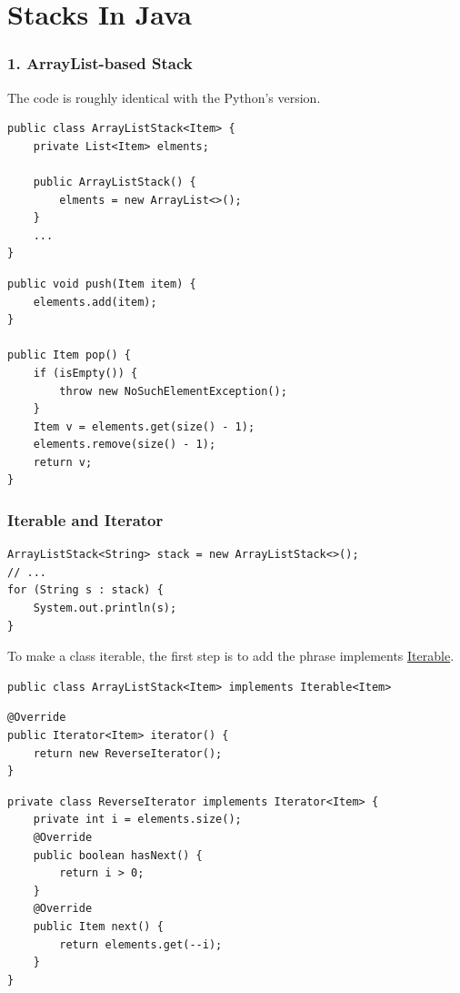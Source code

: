 \documentclass[aspectratio=169, 14pt]{beamer}
\begin{document}
\section{\textcolor{darkmidnightblue}{Stacks In Java}}

\begin{frame}[fragile]
    \frametitle{1. ArrayList-based Stack}
    The code is roughly identical with the Python's version.
    \begin{verbatim}
public class ArrayListStack<Item> {
    private List<Item> elments;

    public ArrayListStack() {
        elments = new ArrayList<>();
    }
    ...
}
    \end{verbatim}
\end{frame}

\begin{frame}[fragile]
    \begin{verbatim}
public void push(Item item) {
    elements.add(item);
}

public Item pop() {
    if (isEmpty()) {
        throw new NoSuchElementException();
    }
    Item v = elements.get(size() - 1);
    elements.remove(size() - 1);
    return v;
}
    \end{verbatim}
\end{frame}

\begin{frame}[fragile]
    \frametitle{Iterable and Iterator}
    \begin{verbatim}
ArrayListStack<String> stack = new ArrayListStack<>();
// ...
for (String s : stack) {
    System.out.println(s);
}    
    \end{verbatim}
To make a class iterable, the first step is to add the phrase implements \href{https://docs.oracle.com/en/java/javase/11/docs/api/java.base/java/lang/Iterable.html}{Iterable}.

\begin{verbatim}
public class ArrayListStack<Item> implements Iterable<Item>
\end{verbatim}
\end{frame}

\begin{frame}[fragile]

\begin{verbatim}
@Override
public Iterator<Item> iterator() {
    return new ReverseIterator();
}
\end{verbatim}

\begin{verbatim}
private class ReverseIterator implements Iterator<Item> {
    private int i = elements.size();
    @Override
    public boolean hasNext() {
        return i > 0;
    }
    @Override
    public Item next() {
        return elements.get(--i);
    }
}
\end{verbatim}
\end{frame}
\end{document}

